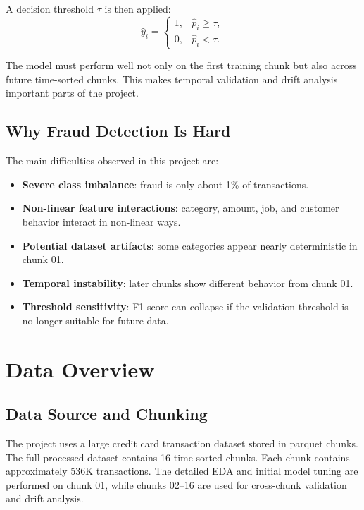 \documentclass[12pt,a4paper]{article}
\begin{document}
A decision threshold $\tau$ is then applied:
\begin{equation}
    \hat{y}_i =
    \begin{cases}
        1, & \hat{p}_i \ge \tau,\\
        0, & \hat{p}_i < \tau.
    \end{cases}
\end{equation}

The model must perform well not only on the first training chunk but also across future time-sorted chunks. This makes temporal validation and drift analysis important parts of the project.

\subsection{Why Fraud Detection Is Hard}

The main difficulties observed in this project are:
\begin{itemize}
    \item \textbf{Severe class imbalance}: fraud is only about 1\% of transactions.
    \item \textbf{Non-linear feature interactions}: category, amount, job, and customer behavior interact in non-linear ways.
    \item \textbf{Potential dataset artifacts}: some categories appear nearly deterministic in chunk 01.
    \item \textbf{Temporal instability}: later chunks show different behavior from chunk 01.
    \item \textbf{Threshold sensitivity}: F1-score can collapse if the validation threshold is no longer suitable for future data.
\end{itemize}

\section{Data Overview}

\subsection{Data Source and Chunking}

The project uses a large credit card transaction dataset stored in parquet chunks. The full processed dataset contains 16 time-sorted chunks. Each chunk contains approximately 536K transactions. The detailed EDA and initial model tuning are performed on chunk 01, while chunks 02--16 are used for cross-chunk validation and drift analysis.
\end{document}
